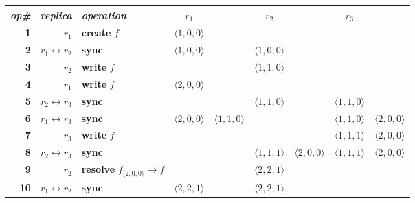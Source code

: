 
\begin{figure*}[t]
\begin{center}
  \begin{tabular}[t]{|r|r@{\quad}l||cc|cc|cc|}
    \hline
    \emph{op\#} & \emph{replica} & \emph{operation}
           & $r_{1}$ & & $r_{2}$ & & $r_{3}$ & \\
    \hline

    \textbf{1} & $r_{1}$ & \textbf{create} $f$ & 
    $\langle 1,0,0\rangle$ & &
     & &
     & \\

    \textbf{2} & $r_1\leftrightarrow r_2$ & \textbf{sync} &
    $\langle 1,0,0 \rangle$ & &
    $\langle 1,0,0 \rangle$ & &
     & \\

    \textbf{3} & $r_{2}$ & \textbf{write} $f$ & 
    & &
    $\langle 1,1,0 \rangle$ & &
     & \\

    \textbf{4} & $r_{1}$ & \textbf{write} $f$ &
    $\langle 2,0,0 \rangle$ & &
    & &
     & \\

    \textbf{5} & $r_{2}\leftrightarrow r_{3}$ & \textbf{sync} &
    & & 
    $\langle 1,1,0 \rangle$ & &
    $\langle 1,1,0 \rangle$ & \\

    \textbf{6} & $r_{1}\leftrightarrow r_{3}$ & \textbf{sync} &
    $\langle 2,0,0 \rangle$ & $\langle 1,1,0 \rangle$ &
    & &
    $\langle 1,1,0 \rangle$ & $\langle 2,0,0 \rangle$ \\

    \textbf{7} & $r_{3}$ &  \textbf{write} $f$ &
    & &
    & & 
    $\langle 1,1,1 \rangle$ & $\langle 2,0,0 \rangle$ \\

    \textbf{8} & $r_{2}\leftrightarrow r_{3}$ & \textbf{sync} &
    & &
    $\langle 1,1,1 \rangle$ & $\langle 2,0,0 \rangle$ & 
    $\langle 1,1,1 \rangle$ & $\langle 2,0,0 \rangle$ \\

    \textbf{9} & $r_{2}$ & \textbf{resolve} $f_{\langle 2,0,0\rangle} \to f$ &
    & &
    $\langle 2,2,1 \rangle$ & &
    & \\

    \textbf{10} & $r_{1}\leftrightarrow r_{2}$ & \textbf{sync} &
    $\langle 2,2,1 \rangle$ & &
    $\langle 2,2,1 \rangle$ & & 
    & \\


\end{tabular}
\end{center}
\end{figure*}
